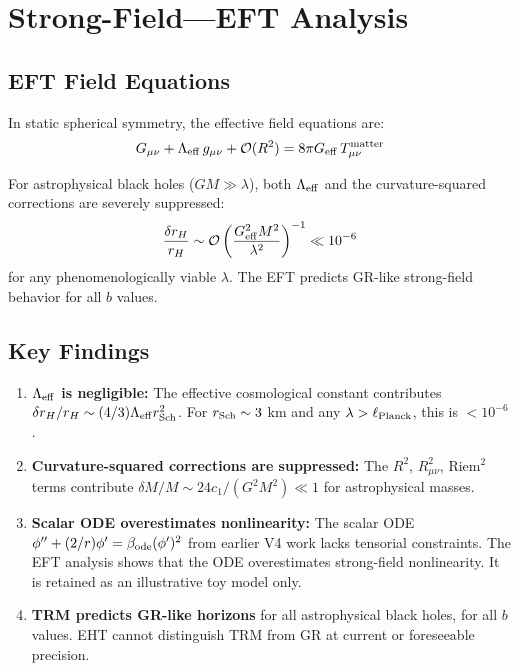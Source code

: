 \documentclass[12pt]{article}
\begin{document}
\section{Strong-Field---EFT Analysis}
\label{sec:strongfield}

\subsection{EFT Field Equations}

In static spherical symmetry, the effective field equations are:
\begin{equation}
G_{\mu\nu} + \Lambda_{\rm eff}\,g_{\mu\nu} + \mathcal{O}(R^2) = 8\pi G_{\rm eff}\,T_{\mu\nu}^{\rm matter}
\end{equation}

For astrophysical black holes ($GM \gg \lambda$), both $\Lambda_{\rm eff}$ and the curvature-squared corrections are severely suppressed:
\begin{equation}
\frac{\delta r_H}{r_H} \sim \mathcal{O}\left(\frac{G_{\rm eff}^2 M^2}{\lambda^2}\right)^{-1} \ll 10^{-6}
\end{equation}
for any phenomenologically viable $\lambda$. The EFT predicts GR-like strong-field behavior for all $b$ values.

\subsection{Key Findings}

\begin{enumerate}
\item \textbf{$\Lambda_{\rm eff}$ is negligible:} The effective cosmological constant contributes $\delta r_H/r_H \sim (4/3)\Lambda_{\rm eff} r_{\rm Sch}^2$. For $r_{\rm Sch} \sim 3$ km and any $\lambda > \ell_{\rm Planck}$, this is $< 10^{-6}$.
\item \textbf{Curvature-squared corrections are suppressed:} The $R^2$, $R_{\mu\nu}^2$, Riem$^2$ terms contribute $\delta M/M \sim 24c_1/(G^2 M^2) \ll 1$ for astrophysical masses.
\item \textbf{Scalar ODE overestimates nonlinearity:} The scalar ODE $\phi''+(2/r)\phi' = \beta_{\rm ode}(\phi')^2$ from earlier V4 work lacks tensorial constraints. The EFT analysis shows that the ODE overestimates strong-field nonlinearity. It is retained as an illustrative toy model only.
\item \textbf{TRM predicts GR-like horizons} for all astrophysical black holes, for all $b$ values. EHT cannot distinguish TRM from GR at current or foreseeable precision.
\end{enumerate}
\end{document}
